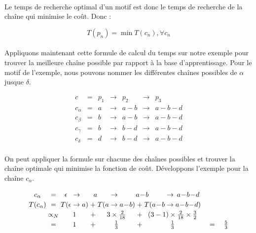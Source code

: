 \documentclass[12pt,french,twoside]{report}
\begin{document}
\paragraph{}Le temps de recherche optimal d'un motif est donc le temps de recherche de la chaîne qui minimise le coût. Donc :

\begin{equation}
 T(p_n) = \min T(c_n), \forall c_n
\end{equation}


\paragraph{}Appliquons maintenant cette formule de calcul du temps sur notre exemple pour trouver la meilleure chaîne possible par
rapport à la base d'apprentissage. Pour le motif de l'exemple, nous pouvons nommer les différentes chaînes possibles de $\alpha$
jusque $\delta$.

\[
\begin{array}{ccccccc}
 c         & = & p_1 & \rightarrow & p_2     & \rightarrow & p_3 \\
 c_\alpha  & = & a   & \rightarrow & a\!-\!b & \rightarrow & a\!-\!b\!-\!d \\
 c_\beta   & = & b   & \rightarrow & a\!-\!b & \rightarrow & a\!-\!b\!-\!d \\
 c_\gamma  & = & b   & \rightarrow & b\!-\!d & \rightarrow & a\!-\!b\!-\!d \\
 c_\delta  & = & d   & \rightarrow & b\!-\!d & \rightarrow & a\!-\!b\!-\!d \\
\end{array}
\]

On peut appliquer la formule sur chacune des chaînes possibles et trouver la chaîne optimale qui minimise la fonction de
coût. Développons l'exemple pour la chaîne $c_{\alpha}$.

\[
\arraycolsep=1.4pt\def\arraystretch{1.2}
\begin{array}{cccccccccccccc}
  c_\alpha    & =  & \epsilon &  \rightarrow &  \multicolumn{3}{c}{a} & \rightarrow & \multicolumn{3}{c}{a\!-\!b} &  \rightarrow & \multicolumn{1}{c}{a\!-\!b\!-\!d} &\\
  T(c_\alpha)   & =  & T( \epsilon &  \rightarrow &  a)  & + & T( a &  \rightarrow  & a\!-\!b) & + & T(a\!-\!b &  \rightarrow & a\!-\!b\!-\!d) &\\
                    & \propto_{N}  &  \multicolumn{3}{c}{1} &  + & \multicolumn{3}{c}{3 \times \frac{2}{18}} & + & \multicolumn{3}{c}{  (3-1)\times \frac{2}{18} \times \frac{3}{2}} &\\
                    & = &  \multicolumn{3}{c}{1} &  + & \multicolumn{3}{c}{\frac{1}{3}} & + & \multicolumn{3}{c}{\frac{1}{3}}   & \quad= \quad\frac{5}{3} \\

\end{array}
\]
\end{document}
